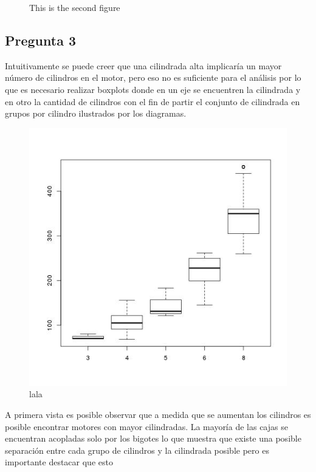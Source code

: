 \documentclass[letter,10pt]{article}
\begin{document}
\begin{minipage}{\linewidth}
\begin{minipage}{0.45\linewidth}
\begin{figure}[H]
              \caption{This is the second figure}
          \end{figure}
      \end{minipage}
  \end{minipage}
  
  

\newpage

\subsection{Pregunta 3}

Intuitivamente se puede creer que una cilindrada alta implicaría un mayor número de cilindros en el motor,
pero eso no es suficiente para el análisis por lo que es necesario realizar boxplots
donde en un eje se encuentren la cilindrada y en otro la cantidad de cilindros con el fin
de partir el conjunto de cilindrada en grupos por cilindro ilustrados por los diagramas.
\begin{figure}[h!]
    \centering
    \includegraphics[scale=0.4]{boxplot_displacement_cylinders.jpg}
    \caption{lala}
    \label{fig:lala}
\end{figure}
A primera vista es posible observar que a medida que se aumentan los cilindros es posible
encontrar motores con mayor cilindradas. La mayoría de las cajas se encuentran acopladas solo por los bigotes lo que muestra
que existe una posible separación entre cada grupo de cilindros y la cilindrada posible pero es importante destacar que esto
\end{document}
